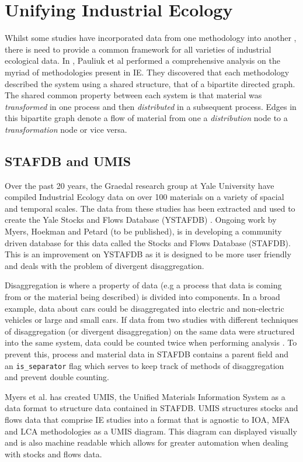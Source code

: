\documentclass[ %
                    author={Tom Jager},
                supervisor={Dr. Daniel Schien},
                    degree={MEng},
                     title={A Bayesian Inference Engine for UMIS Structured Data},
                  subtitle={},
                      type={research},
                      year={2019} ]{dissertation}
\begin{document}
\section{Unifying Industrial Ecology}
Whilst some studies have incorporated data from one methodology into another \cite{chen2016building}, there is need to provide a common framework for all varieties of industrial ecological data. In \cite{pauliuk2015general}, Pauliuk et al performed a comprehensive analysis on the myriad of methodologies present in IE. They discovered that each methodology described the system using a shared structure, that of a bipartite directed graph. The shared common property between each system is that material was \textit{transformed} in one process and then \textit{distributed} in a subsequent process. Edges in this bipartite graph denote a flow of material from one a \textit{distribution} node to a \textit{transformation} node or vice versa.

\subsection{STAFDB and UMIS}
Over the past 20 years, the Graedal research group at Yale University have compiled Industrial Ecology data on over 100 materials on a variety of spacial and temporal scales. The data from these studies has been extracted and used to create the Yale Stocks and Flows Database (YSTAFDB) \cite{ystafdb}. Ongoing work by Myers, Hoekman and Petard (to be published), is in developing a community driven database for this data called the Stocks and Flows Database (STAFDB). This is an improvement on YSTAFDB as it is designed to be more user friendly and deals with the problem of divergent disaggregation.

Disaggregation is where a property of data (e.g a process that data is coming from or the material being described) is divided into components. In a broad example, data about cars could be disaggregated into electric and non-electric vehicles or large and small cars. If data from two studies with different techniques of disaggregation (or divergent disaggregation) on the same data were structured into the same system, data could be counted twice when performing analysis \cite{myers2019unified}. To prevent this, process and material data in STAFDB contains a parent field and an \texttt{is\_separator} flag which serves to keep track of methods of disaggregation and prevent double counting.

Myers et al. has created UMIS, the Unified Materials Information System \cite{myers2019unified} as a data format to structure data contained in STAFDB. UMIS structures stocks and flows data that comprise IE studies into a format that is agnostic to IOA, MFA and LCA methodologies as a UMIS diagram. This diagram can displayed visually and is also machine readable which allows for greater automation when dealing with stocks and flows data.
\end{document}
